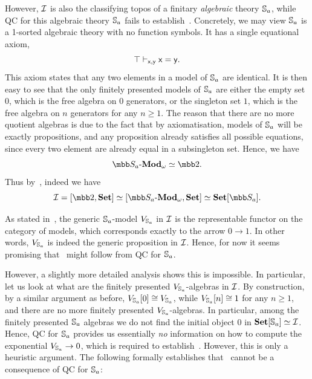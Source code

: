 However, $\mathcal{I}$ is also the classifying topos of a finitary \emph{algebraic} theory $\mathbb{S}_a$, while \gls{QC} for this algebraic theory $\mathbb{S}_a$ fails to establish~. Concretely, we may view $\mathbb{S}_a$ is a 1-sorted algebraic theory with no function symbols. It has a single equational axiom,
\[ \top \vdash_{\mathsf{x},\mathsf{y}} \mathsf{x} = \mathsf{y}. \]
This axiom states that any two elements in a model of $\mathbb{S}_a$ are identical. It is then easy to see that the only finitely presented models of $\mathbb{S}_a$ are either the empty set $0$, which is the free algebra on 0 generators, or the singleton set $1$, which is the free algebra on $n$ generators for any $n \ge 1$. The reason that there are no more quotient algebras is due to the fact that by axiomatisation, models of $\mathbb{S}_a$ will be exactly propositions, and any proposition already satisfies all possible equations, since every two element are already equal in a subsingleton set. Hence, we have
\[ \mmod{\mbb S_a}_\omega \simeq \mbb 2. \]
Thus by~, indeed we have 
\[ \mc I = [\mbb 2,\Set] \simeq [\mmod{\mbb S_a}_\omega,\Set] \simeq \Set[\mbb S_a]. \]

As stated in~, the generic $\mathbb{S}_a$-model $V_{\mathbb{S}_a}$ in $\mathcal{I}$ is the representable functor on the category of models, which corresponds exactly to the arrow $0 \to 1$. In other words, $V_{\mathbb{S}_a}$ is indeed the generic proposition in $\mathcal{I}$. Hence, for now it seems promising that~ might follow from \gls{QC} for $\mathbb{S}_a$.

However, a slightly more detailed analysis shows this is impossible. In particular, let us look at what are the finitely presented $V_{\mathbb{S}_a}$-algebras in $\mathcal{I}$. By construction, by a similar argument as before, $V_{\mathbb{S}_a}[0] \cong V_{\mathbb{S}_a}$, while $V_{\mathbb{S}_a}[n] \cong 1$ for any $n \ge 1$, and there are no more finitely presented $V_{\mathbb{S}_a}$-algebras. In particular, among the finitely presented $\mathbb{S}_a$ algebras we do not find the initial object $0$ in $\mathbf{Set}[\mathbb{S}_a] \simeq \mathcal{I}$. Hence, \gls{QC} for $\mathbb{S}_a$ provides us essentially \emph{no} information on how to compute the exponential $V_{\mathbb{S}_a} \to 0$, which is required to establish~. However, this is only a heuristic argument. The following formally establishes that~ cannot be a consequence of \gls{QC} for $\mathbb{S}_a$:

